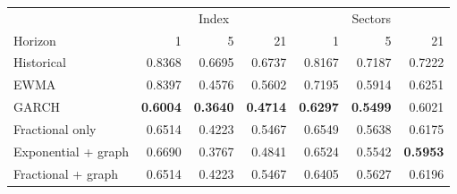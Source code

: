 \begin{tabular}{lrrrrrr}
\toprule
 & \multicolumn{3}{c}{Index} & \multicolumn{3}{c}{Sectors} \\
Horizon & 1 & 5 & 21 & 1 & 5 & 21 \\
\midrule
Historical & 0.8368 & 0.6695 & 0.6737 & 0.8167 & 0.7187 & 0.7222 \\
EWMA & 0.8397 & 0.4576 & 0.5602 & 0.7195 & 0.5914 & 0.6251 \\
GARCH & \textbf{0.6004} & \textbf{0.3640} & \textbf{0.4714} & \textbf{0.6297} & \textbf{0.5499} & 0.6021 \\
Fractional only & 0.6514 & 0.4223 & 0.5467 & 0.6549 & 0.5638 & 0.6175 \\
Exponential + graph & 0.6690 & 0.3767 & 0.4841 & 0.6524 & 0.5542 & \textbf{0.5953} \\
Fractional + graph & 0.6514 & 0.4223 & 0.5467 & 0.6405 & 0.5627 & 0.6196 \\
\bottomrule
\end{tabular}
